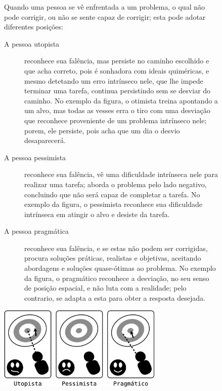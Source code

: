 \begin{figure}[!ht]
\begin{elaboracion}[title=O utopista{,} o pessimista e o pragmático, width= 1.00\linewidth]
Quando uma pessoa se vê enfrentada a um problema, 
o qual não pode corrigir,
ou não se sente capaz de corrigir; esta pode adotar diferentes posições:
\begin{description}
\item[A pessoa utopista] reconhece sua falência, mas persiste no caminho  escolhido
e que acha correto, pois é sonhadora com ideais quiméricas, 
e mesmo detetando um erro intrínseco nele, que lhe impede terminar uma tarefa,
continua persistindo sem se desviar do caminho.
No exemplo da figura, o otimista treina apontando a um alvo, 
mas todas as vesses erra o tiro com uma desviação que reconhece proveniente de um problema intrínseco nele;
porem, ele persiste, pois acha que um dia o desvio desaparecerá.
\item[A pessoa pessimista] reconhece sua falência, 
vê uma dificuldade intrínseca nele para realizar uma tarefa; aborda o problema pelo lado negativo,
concluindo que não será capaz de completar a tarefa.
No exemplo da figura, o pessimista reconhece sua dificuldade intrínseca em atingir o alvo
e desiste da tarefa. 
\item[A pessoa pragmática] reconhece sua falência, e se estas não podem ser corrigidas,
procura soluções práticas, realistas e objetivas, 
aceitando abordagens e soluções quase-ótimas ao problema.
No exemplo da figura, o pragmático reconhece a desviação,
 no seu senso de posição espacial, e não luta com a realidade; pelo contrario, se adapta a esta 
para obter a resposta desejada. 
\end{description}
\begin{center}
    \includegraphics[width=0.7\textwidth]{chapters/cap-body-control/problema-generico-completo.eps}
\end{center}
\end{elaboracion}
\end{figure}

